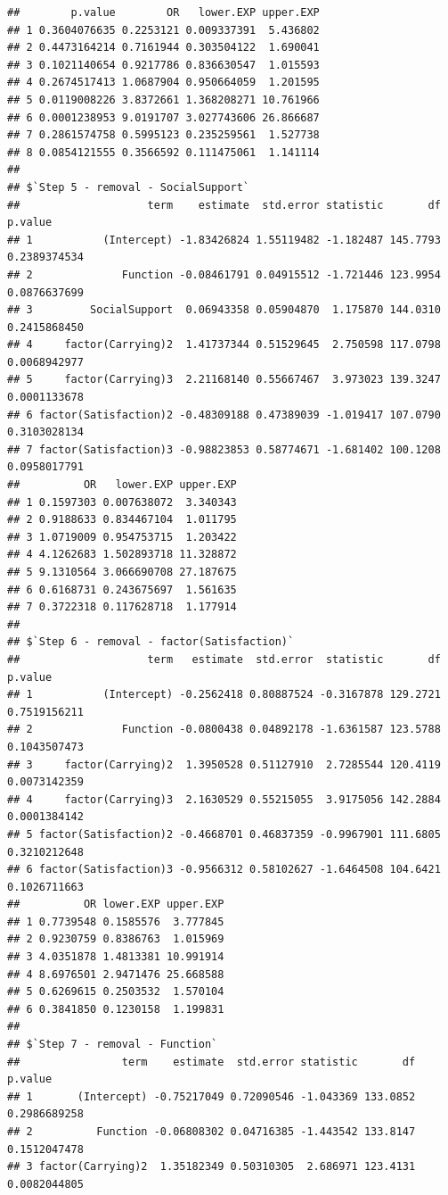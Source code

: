 \documentclass[
]{book}
\begin{document}
\begin{verbatim}
##        p.value        OR   lower.EXP upper.EXP
## 1 0.3604076635 0.2253121 0.009337391  5.436802
## 2 0.4473164214 0.7161944 0.303504122  1.690041
## 3 0.1021140654 0.9217786 0.836630547  1.015593
## 4 0.2674517413 1.0687904 0.950664059  1.201595
## 5 0.0119008226 3.8372661 1.368208271 10.761966
## 6 0.0001238953 9.0191707 3.027743606 26.866687
## 7 0.2861574758 0.5995123 0.235259561  1.527738
## 8 0.0854121555 0.3566592 0.111475061  1.141114
## 
## $`Step 5 - removal - SocialSupport`
##                    term    estimate  std.error statistic       df      p.value
## 1           (Intercept) -1.83426824 1.55119482 -1.182487 145.7793 0.2389374534
## 2              Function -0.08461791 0.04915512 -1.721446 123.9954 0.0876637699
## 3         SocialSupport  0.06943358 0.05904870  1.175870 144.0310 0.2415868450
## 4     factor(Carrying)2  1.41737344 0.51529645  2.750598 117.0798 0.0068942977
## 5     factor(Carrying)3  2.21168140 0.55667467  3.973023 139.3247 0.0001133678
## 6 factor(Satisfaction)2 -0.48309188 0.47389039 -1.019417 107.0790 0.3103028134
## 7 factor(Satisfaction)3 -0.98823853 0.58774671 -1.681402 100.1208 0.0958017791
##          OR   lower.EXP upper.EXP
## 1 0.1597303 0.007638072  3.340343
## 2 0.9188633 0.834467104  1.011795
## 3 1.0719009 0.954753715  1.203422
## 4 4.1262683 1.502893718 11.328872
## 5 9.1310564 3.066690708 27.187675
## 6 0.6168731 0.243675697  1.561635
## 7 0.3722318 0.117628718  1.177914
## 
## $`Step 6 - removal - factor(Satisfaction)`
##                    term   estimate  std.error  statistic       df      p.value
## 1           (Intercept) -0.2562418 0.80887524 -0.3167878 129.2721 0.7519156211
## 2              Function -0.0800438 0.04892178 -1.6361587 123.5788 0.1043507473
## 3     factor(Carrying)2  1.3950528 0.51127910  2.7285544 120.4119 0.0073142359
## 4     factor(Carrying)3  2.1630529 0.55215055  3.9175056 142.2884 0.0001384142
## 5 factor(Satisfaction)2 -0.4668701 0.46837359 -0.9967901 111.6805 0.3210212648
## 6 factor(Satisfaction)3 -0.9566312 0.58102627 -1.6464508 104.6421 0.1026711663
##          OR lower.EXP upper.EXP
## 1 0.7739548 0.1585576  3.777845
## 2 0.9230759 0.8386763  1.015969
## 3 4.0351878 1.4813381 10.991914
## 4 8.6976501 2.9471476 25.668588
## 5 0.6269615 0.2503532  1.570104
## 6 0.3841850 0.1230158  1.199831
## 
## $`Step 7 - removal - Function`
##                term    estimate  std.error statistic       df      p.value
## 1       (Intercept) -0.75217049 0.72090546 -1.043369 133.0852 0.2986689258
## 2          Function -0.06808302 0.04716385 -1.443542 133.8147 0.1512047478
## 3 factor(Carrying)2  1.35182349 0.50310305  2.686971 123.4131 0.0082044805

\end{verbatim}
\end{document}
